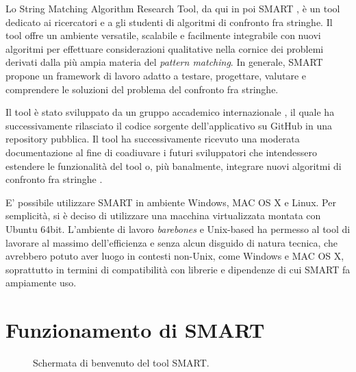 Lo String Matching Algorithm Research Tool, da qui in poi SMART \cite{smart}, è un tool dedicato ai ricercatori e a gli studenti di algoritmi di confronto fra stringhe. Il tool offre un ambiente versatile, scalabile e facilmente integrabile con nuovi algoritmi per effettuare considerazioni qualitative nella cornice dei problemi derivati dalla più ampia materia del \textit{pattern matching}. In generale, SMART propone un framework di lavoro adatto a testare, progettare, valutare e comprendere le soluzioni del problema del confronto fra stringhe. 

\vspace{3mm}

Il tool è stato sviluppato da un gruppo accademico internazionale \cite{smartHomepage}, il quale ha successivamente rilasciato il codice sorgente dell'applicativo su GitHub in una repository pubblica. Il tool ha successivamente ricevuto una moderata documentazione al fine di coadiuvare i futuri sviluppatori che intendessero estendere le funzionalità del tool o, più banalmente, integrare nuovi algoritmi di confronto fra stringhe \cite{smartHelp}.

\vspace{3mm}

E' possibile utilizzare SMART in ambiente Windows, MAC OS X e Linux. Per semplicità, si è deciso di utilizzare una macchina virtualizzata montata con Ubuntu 64bit. L'ambiente di lavoro \textit{barebones} e Unix-based ha permesso al tool di lavorare al massimo dell'efficienza e senza alcun disguido di natura tecnica, che avrebbero potuto aver luogo in contesti non-Unix, come Windows e MAC OS X, soprattutto in termini di compatibilità con librerie e dipendenze di cui SMART fa ampiamente uso.

\section{Funzionamento di SMART}

\begin{figure}[ht!]
    \centering
    \caption{Schermata di benvenuto del tool SMART.}
    \label{fig:esempio}
\end{figure}

